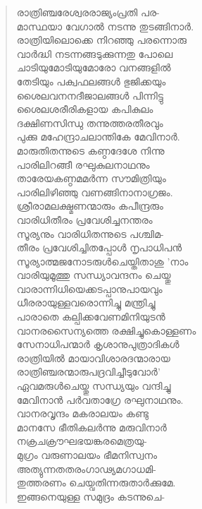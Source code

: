 \begin{verse}
രാത്രിഞ്ചരേശ്വരരാജ്യംപ്രതി പര-\\
മാസ്ഥയാ വേഗാല്‍ നടന്നു തുടങ്ങിനാര്‍.\\
രാത്രിയിലൊക്കെ നിറഞ്ഞു പരന്നൊരു\\
വാര്‍ദ്ധി നടന്നങ്ങടുക്കുന്നതു പോലെ\\
ചാടിയുമോടിയുമോരോ വനങ്ങളില്‍\\
തേടിയും പക്വഫലങ്ങള്‍ ഭുജിക്കയും\\
ശൈലവനനദീജാലങ്ങള്‍ പിന്നിട്ടു\\
ശൈലശരീരികളായ കപികുലം\\
ദക്ഷിണസിന്ധു തന്നുത്തരതീരവും\\
പുക്കു മഹേന്ദ്രാചലാന്തികേ മേവിനാര്‍.\\
മാരുതിതന്നുടെ കണ്ഠദേശേ നിന്നു\\
പാരിലിറങ്ങീ രഘുകുലനാഥനും\\
താരേയകണ്ഠമമര്‍ന്ന സൗമിത്രിയും\\
പാരിലിഴിഞ്ഞു വണങ്ങിനാനാഗ്രജം.\\
ശ്രീരാമലക്ഷ്മണന്മാരും കപീന്ദ്രരും\\
വാരിധിതീരം പ്രവേശിച്ചനന്തരം\\
സൂര്യനും വാരിധിതന്നുടെ പശ്ചിമ-\\
തീരം പ്രവേശിച്ചിതപ്പോള്‍ നൃപാധിപന്‍\\
സൂര്യാത്മജനോടരുള്‍ചെയ്തിതാശു ’നാം\\
വാരിയുമൂത്തു സന്ധ്യാവന്ദനം ചെയ്തു\\
വാരാന്നിധിയെക്കടപ്പാനുപായവും\\
ധീരരായുള്ളവരൊന്നിച്ചു മന്ത്രിച്ചു\\
പാരാതെ കല്പിക്കവേണമിനിയുടന്‍\\
വാനരസൈന്യത്തെ രക്ഷിച്ചുകൊള്ളണം\\
സേനാധിപന്മാര്‍ കൃശാനുപുത്രാദികള്‍\\
രാത്രിയില്‍ മായാവിശാരദന്മാരായ\\
രാത്രിഞ്ചരന്മാരുപദ്രവിച്ചീടുവോര്‍’\\
ഏവമരുള്‍ചെയ്തു സന്ധ്യയും വന്ദിച്ചു\\
മേവിനാന്‍ പര്‍വതാഗ്രേ രഘുനാഥനും.\\
വാനരവൃന്ദം മകരാലയം കണ്ടു\\
മാനസേ ഭീതികലര്‍ന്നു മരുവിനാര്‍\\
നക്രചക്രൗഘഭയങ്കരമെത്രയു-\\
മുഗ്രം വരുണാലയം ഭീമനിസ്വനം\\
അത്യുന്നതതരംഗാഢ്യമഗാധമി-\\
തുത്തരണം ചെയ്വതിന്നരുതാര്‍ക്കുമേ.\\
ഇങ്ങനെയുള്ള സമുദ്രം കടന്നുചെ-\\

\end{verse}
